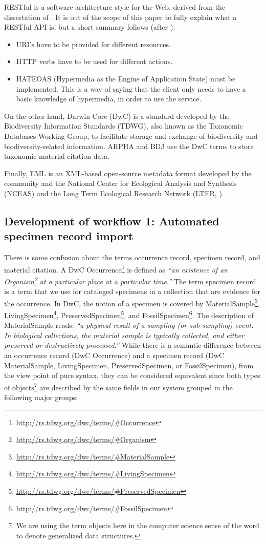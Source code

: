 RESTful is a software architecture style for the Web, derived from the dissertation of \cite{fielding_architectural_2000}. It is out of the scope of this paper to fully explain what a RESTful API is, but a short summary follows (after \cite{kurtz_what_2013}):

\begin{itemize}
\item{URI's have to be provided for different resources.}
\item{HTTP verbs have to be used for different actions.}
\item{HATEOAS (Hypermedia as the Engine of Application State) must be implemented. This is a way of saying that the client only needs to have a basic knowledge of hypermedia, in order to use the service.}
\end{itemize}

On the other hand, Darwin Core (DwC) is a standard developed by the Biodiversity Information Standards (TDWG), also known as the Taxonomic Databases Working Group, to facilitate storage and exchange of biodiversity and biodiversity-related information. ARPHA and BDJ use the DwC terms to store taxonomic material citation data.

Finally, EML is an XML-based open-source metadata format developed by the community and the National Center for Ecological Analysis and Synthesis (NCEAS) and the Long Term Ecological Research Network (LTER, \cite{fegraus_maximizing_2005}).

\subsection{Development of workflow 1: Automated specimen record import}

There is some confusion about the terms occurrence record, specimen record, and material citation. A DwC Occurrence\footnote{\url{http://rs.tdwg.org/dwc/terms/\#Occurrence}} is defined as \emph{``an existence of an Organism\footnote{\url{http://rs.tdwg.org/dwc/terms/\#Organism}} at a particular place at a particular time.''} The term specimen record is a term that we use for cataloged specimens in a collection that are evidence for the occurrence. In DwC, the notion of a specimen is covered by MaterialSample\footnote{\url{http://rs.tdwg.org/dwc/terms/\#MaterialSample}}, LivingSpecimen\footnote{\url{http://rs.tdwg.org/dwc/terms/\#LivingSpecimen}}, PreservedSpecimen\footnote{\url{http://rs.tdwg.org/dwc/terms/\#PreservedSpecimen}}, and FossilSpecimen\footnote{\url{http://rs.tdwg.org/dwc/terms/\#FossilSpecimen}}. The description of MaterialSample reads: \emph{``a physical result of a sampling (or sub-sampling) event. In biological collections, the material sample is typically collected, and either preserved or destructively processed.''} While there is a semantic difference between an occurrence record (DwC Occurrence) and a specimen record (DwC MaterialSample, LivingSpecimen, PreservedSpecimen, or FossilSpecimen), from the view point of pure syntax, they can be considered equivalent since both types of objects\footnote{We are using the term objects here in the computer science sense of the word to denote generalized data structures.} are described by the same fields in our system grouped in the following major groups:


